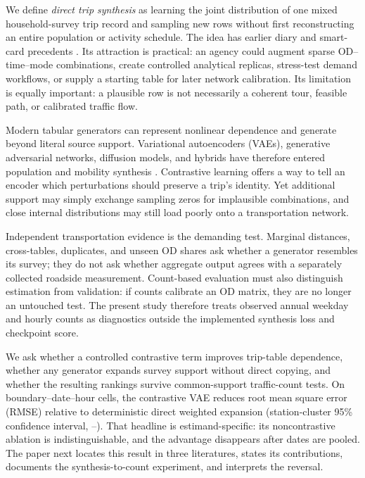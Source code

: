 \documentclass[numbered]{trbunofficial}
\newcommand{\CVAE}{contrastive VAE}
\begin{document}
We define \emph{direct trip synthesis} as learning the joint distribution of one mixed household-survey trip record and sampling new rows without first reconstructing an entire population or activity schedule. The idea has earlier diary and smart-card precedents \citep{greaves2000survey,kieu2023smartcard}. Its attraction is practical: an agency could augment sparse OD--time--mode combinations, create controlled analytical replicas, stress-test demand workflows, or supply a starting table for later network calibration. Its limitation is equally important: a plausible row is not necessarily a coherent tour, feasible path, or calibrated traffic flow.

Modern tabular generators can represent nonlinear dependence and generate beyond literal source support. Variational autoencoders (VAEs), generative adversarial networks, diffusion models, and hybrids have therefore entered population and mobility synthesis \citep{borysov2019microagents,kapp2024review,choi2025tutorial}. Contrastive learning offers a way to tell an encoder which perturbations should preserve a trip's identity. Yet additional support may simply exchange sampling zeros for implausible combinations, and close internal distributions may still load poorly onto a transportation network.

Independent transportation evidence is the demanding test. Marginal distances, cross-tables, duplicates, and unseen OD shares ask whether a generator resembles its survey; they do not ask whether aggregate output agrees with a separately collected roadside measurement. Count-based evaluation must also distinguish estimation from validation: if counts calibrate an OD matrix, they are no longer an untouched test. The present study therefore treats observed annual weekday and hourly counts as diagnostics outside the implemented synthesis loss and checkpoint score.

We ask whether a controlled contrastive term improves trip-table dependence, whether any generator expands survey support without direct copying, and whether the resulting rankings survive common-support traffic-count tests. On \ExactHourlyCells{} boundary--date--hour cells, the \CVAE{} reduces root mean square error (RMSE) \ExactReductionDirect{} relative to deterministic direct weighted expansion (station-cluster 95\% confidence interval, \ExactReductionDirectLow{}--\ExactReductionDirectHigh{}). That headline is estimand-specific: its noncontrastive ablation is indistinguishable, and the advantage disappears after dates are pooled. The paper next locates this result in three literatures, states its contributions, documents the synthesis-to-count experiment, and interprets the reversal.
\end{document}

